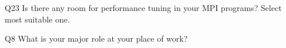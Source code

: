 \begin{description}%
\item{Q23} Is there any room for performance tuning in your MPI programs? Select most suitable one.%
\item{Q8} What is your major role at your place of work?%
\end{description}%

